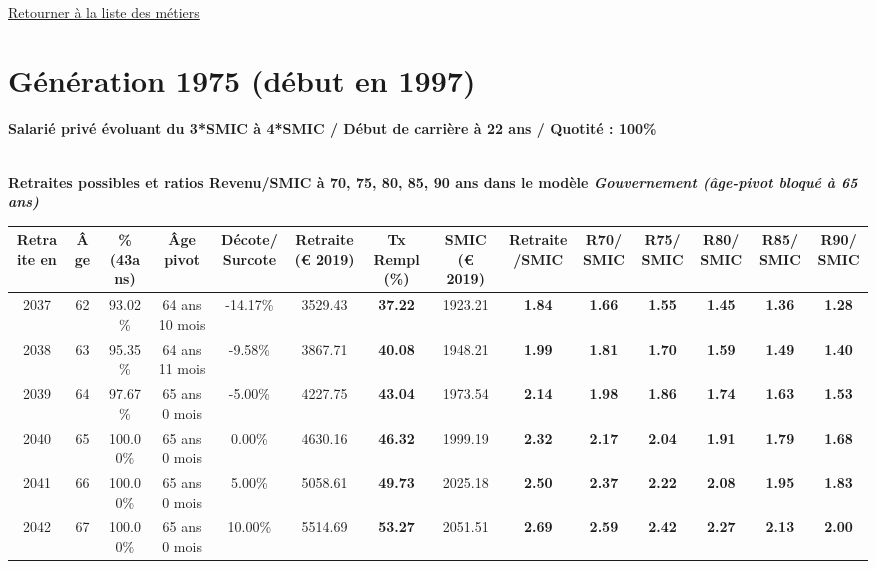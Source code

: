 

   
 \localtableofcontents 

~\\ 
 
 \hyperlink{page.2}{\noindent Retourner à la liste des métiers}

 \newpage 

\section{Génération 1975 (début en 1997)\label{Ascendant45_100_1975_22_0}} 
 
{\bf \noindent Salarié privé évoluant du 3*SMIC à 4*SMIC / Début de carrière à 22 ans / Quotité : 100\%}  ~ 

 ~\\{\bf \noindent Retraites possibles et ratios Revenu/SMIC à 70, 75, 80, 85, 90 ans dans le modèle \emph{Gouvernement (âge-pivot bloqué à 65 ans)}}  
 
\begin{adjustbox}{max width=\textwidth} 
\begin{tabular}[htb]{|c|c||c|c|c||c|c||c|c||c|c|c|c|c|} 
\hline 
 Retraite en &  Âge &  \%(43ans) &  Âge pivot &  Décote/Surcote &  Retraite (\euro{} 2019) &  Tx Rempl(\%) &  SMIC (\euro{} 2019) &  Retraite/SMIC &  R70/SMIC &  R75/SMIC &  R80/SMIC &  R85/SMIC &  R90/SMIC \\ 
\hline \hline 
 2037 &  62 &  93.02\% &  64 ans 10 mois &  -14.17\% &  3529.43 &  {\bf 37.22} &  1923.21 &  {\bf 1.84} &  {\bf 1.66} &  {\bf 1.55} &  {\bf 1.45} &  {\bf 1.36} &  {\bf 1.28} \\ 
\hline 
 2038 &  63 &  95.35\% &  64 ans 11 mois &  -9.58\% &  3867.71 &  {\bf 40.08} &  1948.21 &  {\bf 1.99} &  {\bf 1.81} &  {\bf 1.70} &  {\bf 1.59} &  {\bf 1.49} &  {\bf 1.40} \\ 
\hline 
 2039 &  64 &  97.67\% &  65 ans 0 mois &  -5.00\% &  4227.75 &  {\bf 43.04} &  1973.54 &  {\bf 2.14} &  {\bf 1.98} &  {\bf 1.86} &  {\bf 1.74} &  {\bf 1.63} &  {\bf 1.53} \\ 
\hline 
 2040 &  65 &  100.00\% &  65 ans 0 mois &  0.00\% &  4630.16 &  {\bf 46.32} &  1999.19 &  {\bf 2.32} &  {\bf 2.17} &  {\bf 2.04} &  {\bf 1.91} &  {\bf 1.79} &  {\bf 1.68} \\ 
\hline 
 2041 &  66 &  100.00\% &  65 ans 0 mois &  5.00\% &  5058.61 &  {\bf 49.73} &  2025.18 &  {\bf 2.50} &  {\bf 2.37} &  {\bf 2.22} &  {\bf 2.08} &  {\bf 1.95} &  {\bf 1.83} \\ 
\hline 
 2042 &  67 &  100.00\% &  65 ans 0 mois &  10.00\% &  5514.69 &  {\bf 53.27} &  2051.51 &  {\bf 2.69} &  {\bf 2.59} &  {\bf 2.42} &  {\bf 2.27} &  {\bf 2.13} &  {\bf 2.00} \\ 
\hline 
\hline 
\end{tabular} 
\end{adjustbox} 
 
